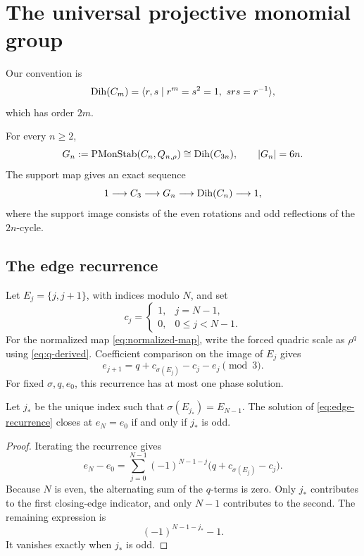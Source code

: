 \section{The universal projective monomial group}
\label{sec:universal-group}

Our convention is
\[
\operatorname{Dih}(C_m)=
\langle r,s\mid r^m=s^2=1,\ srs=r^{-1}\rangle,
\]
which has order \(2m\).

\begin{theorem}
\label{thm:universal-group}
For every \(n\ge2\),
\[
G_n:=\operatorname{PMonStab}(C_n,Q_{n,\rho})
\cong\operatorname{Dih}(C_{3n}),\qquad |G_n|=6n.
\]
The support map gives an exact sequence
\[
1\longrightarrow C_3\longrightarrow G_n
\longrightarrow\operatorname{Dih}(C_n)\longrightarrow1,
\]
where the support image consists of the even rotations and odd reflections
of the \(2n\)-cycle.
\end{theorem}

\subsection{The edge recurrence}

Let \(E_j=\{j,j+1\}\), with indices modulo \(N\), and set
\[
c_j=\begin{cases}
1,&j=N-1,\\
0,&0\le j<N-1.
\end{cases}
\]
For the normalized map \eqref{eq:normalized-map}, write the forced quadric
scale as \(\rho^q\) using \eqref{eq:q-derived}.  Coefficient comparison on
the image of \(E_j\) gives
\begin{equation}
e_{j+1}=q+c_{\sigma(E_j)}-c_j-e_j\pmod3.
\label{eq:edge-recurrence}
\end{equation}
For fixed \(\sigma,q,e_0\), this recurrence has at most one phase solution.

\begin{lemma}
\label{lem:closure-parity}
Let \(j_*\) be the unique index such that
\(\sigma(E_{j_*})=E_{N-1}\).  The solution of
\eqref{eq:edge-recurrence} closes at \(e_N=e_0\) if and only if \(j_*\)
is odd.
\end{lemma}

\begin{proof}
Iterating the recurrence gives
\[
e_N-e_0=
\sum_{j=0}^{N-1}(-1)^{N-1-j}
\bigl(q+c_{\sigma(E_j)}-c_j\bigr).
\]
Because \(N\) is even, the alternating sum of the \(q\)-terms is zero.
Only \(j_*\) contributes to the first closing-edge indicator, and only
\(N-1\) contributes to the second.  The remaining expression is
\[
(-1)^{N-1-j_*}-1.
\]
It vanishes exactly when \(j_*\) is odd.
\end{proof}

